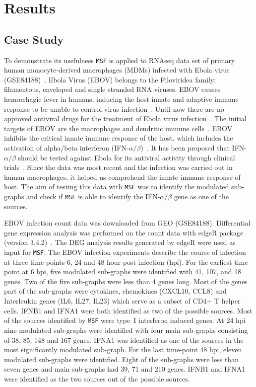 \documentclass[10pt,a4paper,twocolumn]{article}
\begin{document}
\section*{Results}

\subsection*{Case Study}

To demonstrate its usefulness \texttt{MSF} is applied to RNAseq data
set of primary human monocyte-derived macrophages (MDMs) infected with
Ebola virus (GSE84188)~\cite{Olejnik}. Ebola Virus (EBOV) belongs to
the Filoviridea family; filamentous, enveloped and single stranded RNA
viruses. EBOV causes hemorrhagic fever in humans, inducing the host
innate and adaptive immune response to be unable to control virus
infection~\cite{Prins}. Until now there are no approved antiviral
drugs for the treatment of Ebola virus infection~\cite{Konde,Rhein}.
The initial targets of EBOV are the macrophages and dendritic immune
cells~\cite{Falasca,Rhein}. EBOV inhibits the critical innate immune
response of the host, which includes the activation of alpha/beta
interferon (IFN-$\alpha / \beta$)~\cite{Prins,Konde,Cardenas}. It has been proposed
that IFN-$\alpha / \beta$ should be tested against Ebola for its
antiviral activity through clinical trials~\cite{Konde}. Since the data was most recent and the  infection was carried out in human macrophages, it helped us comprehend the innate immune response of host. The aim of
testing this data with \texttt{MSF} was to identify the
modulated sub-graphs and check if \texttt{MSF} is able to identify the
IFN-$\alpha / \beta$ gene as one of the sources.

EBOV infection count data was downloaded from GEO
(GSE84188). Differential gene expression analysis was performed on the
count data with edgeR package (version 3.4.2)~\cite{edgeR}. The DEG
analysis results generated by edgeR were used as input for \texttt{MSF}. The
EBOV infection experiments describe the course of infection at three time-points 6, 24 and 48 hour post
infection (hpi). For the earliest time point at 6 hpi, five modulated sub-graphs were
identified with 41, 107, and 18 genes. Two of the five sub-graphs were less than 4 genes long. Most of the genes part of the sub-graphs were cytokines, chemokines
(CXCL10, CCL8) and Interleukin genes (IL6, IL27, IL23) which serve as
a subset of CD4+ T helper cells. IFNB1 and IFNA1 were both identified
as two of the possible sources. Most of the sources identified by
\texttt{MSF} were type~I interferon induced genes. At 24 hpi nine
modulated sub-graphs were identified with four main sub-graphs consisting of 38, 85, 148 and 167 genes. IFNA1 was identified as one of
the sources in the most significantly modulated sub-graph. For the last time-point 48 hpi, eleven modulated sub-graphs were identified. Eight of the sub-graphs were less than seven genes and main sub-graphs had 39, 71 and 210 genes. IFNB1 and IFNA1 were
identified as the two sources out of the possible sources.
\end{document}
